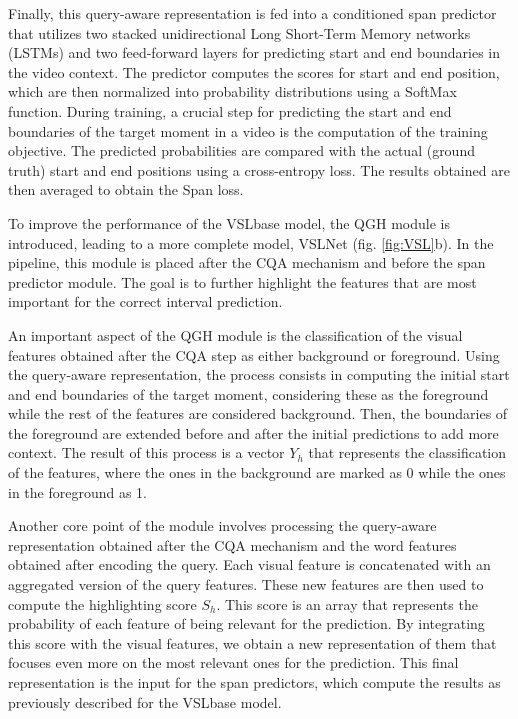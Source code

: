 \documentclass[10pt,twocolumn,letterpaper]{article}
\begin{document}
Finally, this query-aware representation is fed into a conditioned span predictor that utilizes two stacked unidirectional Long Short-Term Memory networks (LSTMs) and two feed-forward layers for predicting start and end boundaries in the video context. The predictor computes the scores for start and end position, which are then normalized into probability distributions using a SoftMax function. During training, a crucial step for predicting the start and end boundaries of the target moment in a video is the computation of the training objective. The predicted probabilities are compared with the actual (ground truth) start and end positions using a cross-entropy loss. The results obtained are then averaged to obtain the Span loss.

To improve the performance of the VSLbase model, the QGH module is introduced, leading to a more complete model, VSLNet (fig. \ref{fig:VSL}b). In the pipeline, this module is placed after the CQA mechanism and before the span predictor module. The goal is to further highlight the features that are most important for the correct interval prediction.

An important aspect of the QGH module is the classification of the visual features obtained after the CQA step as either background or foreground. Using the query-aware representation, the process consists in computing the initial start and end boundaries of the target moment, considering these as the foreground while the rest of the features are considered background. Then, the boundaries of the foreground are extended before and after the initial predictions to add more context. The result of this process is a vector $Y_{h}$ that represents the classification of the features, where the ones in the background are marked as 0 while the ones in the foreground as 1.

Another core point of the module involves processing the query-aware representation obtained after the CQA mechanism and the word features obtained after encoding the query. Each visual feature is concatenated with an aggregated version of the query features. These new features are then used to compute the highlighting score $S_{h}$. This score is an array that  represents the probability of each feature of being relevant for the prediction. By integrating this score with the visual features, we obtain a new representation of them that focuses even more on the most relevant ones for the prediction. This final representation is the input for the span predictors, which compute the results as previously described for the VSLbase model.
\end{document}
